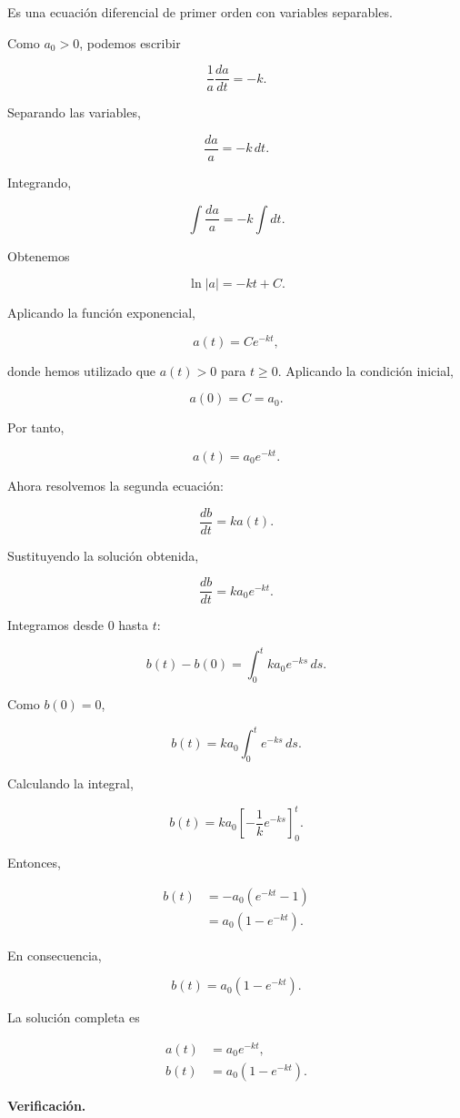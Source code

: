 \documentclass[a4paper,12pt]{article}
\begin{document}
\begin{enumerate}[leftmargin=*,
itemsep=0.8cm]
\begin{enumerate}[label=\alph*),
leftmargin=*,itemsep=0.5cm]
Es una ecuación diferencial
de primer orden con
variables separables.

Como $a_0>0$, podemos
escribir

\[
\frac{1}{a}\frac{da}{dt}=-k.
\]

Separando las variables,

\[
\frac{da}{a}=-k\,dt.
\]

Integrando,

\[
\int\frac{da}{a}
=
-k\int dt.
\]

Obtenemos

\[
\ln|a|=-kt+C.
\]

Aplicando la función
exponencial,

\[
a(t)=Ce^{-kt},
\]

donde hemos utilizado que
$a(t)>0$ para $t\geq0$. Aplicando la condición inicial,

\[
a(0)=C=a_0.
\]

Por tanto,

\[
\boxed{a(t)=a_0e^{-kt}.}
\]

Ahora resolvemos la segunda
ecuación:

\[
\frac{db}{dt}=ka(t).
\]

Sustituyendo la solución
obtenida,

\[
\frac{db}{dt}
=ka_0e^{-kt}.
\]

Integramos desde $0$ hasta $t$:

\[
b(t)-b(0)
=
\int_0^t ka_0e^{-ks}\,ds.
\]

Como $b(0)=0$,

\[
b(t)
=
ka_0\int_0^t e^{-ks}\,ds.
\]

Calculando la integral,

\[
b(t)
=
ka_0
\left[
-\frac{1}{k}e^{-ks}
\right]_0^t.
\]

Entonces,

\[
\begin{aligned}
b(t)
&=-a_0(e^{-kt}-1)\\
&=a_0(1-e^{-kt}).
\end{aligned}
\]

En consecuencia,

\[
\boxed{
b(t)=a_0(1-e^{-kt}).
}
\]

La solución completa es

\[
\boxed{
\begin{aligned}
a(t)&=a_0e^{-kt},\\
b(t)&=a_0(1-e^{-kt}).
\end{aligned}
}
\]

\textbf{Verificación.}


\end{enumerate}
\end{enumerate}
\end{document}
